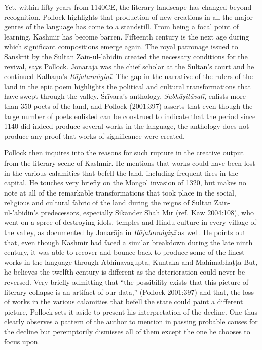 Yet, within fifty years from 1140CE, the literary landscape has changed beyond recognition. Pollock highlights that production of new creations in all the major genres of the language has come to a standstill. From being a focal point of learning, Kashmir has become barren. Fifteenth century is the next age during which significant compositions emerge again. The royal patronage issued to Sanskrit by the Sultan Zain-ul-'abidin created the necessary conditions for the revival, says Pollock. Jonarāja was the chief scholar at the Sultan’s court and he continued Kalhaṇa’s {\sl Rājataraṅgiṇī}. The gap in the narrative of the rulers of the land in the epic poem highlights the political and cultural transformations that have swept through the valley. Śrīvara’s anthology, {\sl Subhāṣitāvalī}, enlists more than 350 poets of the land, and Pollock (2001:397) asserts that even though the large number of poets enlisted can be construed to indicate that the period since 1140 did indeed produce several works in the language, the anthology does not produce any proof that works of significance were created.

Pollock then inquires into the reasons for such rupture in the creative output from the literary scene of Kashmir. He mentions that works could have been lost in the various calamities that befell the land, including frequent fires in the capital. He touches very briefly on the Mongol invasion of 1320, but makes no note at all of the remarkable transformations that took place in the social, religious and cultural fabric of the land during the reigns of Sultan Zain-ul-'abidin’s predecessors, especially Sikander Shāh Mīr (ref. Kaw 2004:108), who went on a spree of destroying idols, temples and Hindu culture in every village of the valley, as documented by Jonarāja in {\sl Rājataraṅgiṇī} as well. He points out that, even though Kashmir had faced a similar breakdown during the late ninth century, it was able to recover and bounce back to produce some of the finest works in the language through Abhinavagupta, Kuntaka and Mahimabhaṭṭa But, he believes the twelfth century is different as the deterioration could never be reversed. Very briefly admitting that “the possibility exists that this picture of literary collapse is an artifact of our data,” (Pollock 2001:397) and that, the loss of works in the various calamities that befell the state could paint a different picture, Pollock sets it aside to present his interpretation of the decline. One thus clearly observes a pattern of the author to mention in passing probable causes for the decline but peremptorily dismisses all of them except the one he chooses to focus upon.

